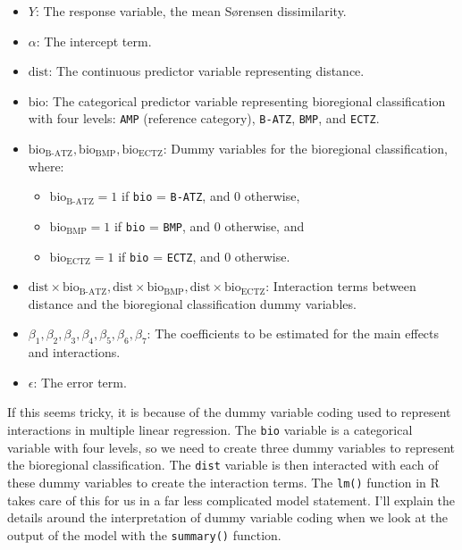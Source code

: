 \documentclass[
  letterpaper,
]{book}
\providecommand{\tightlist}{%
  \setlength{\itemsep}{0pt}\setlength{\parskip}{0pt}}\usepackage{longtable,booktabs,array}
\begin{document}
\begin{itemize}
\tightlist
\item
  \(Y\): The response variable, the mean Sørensen dissimilarity.
\item
  \(\alpha\): The intercept term.
\item
  \(\text{dist}\): The continuous predictor variable representing
  distance.
\item
  \(\text{bio}\): The categorical predictor variable representing
  bioregional classification with four levels: \texttt{AMP} (reference
  category), \texttt{B-ATZ}, \texttt{BMP}, and \texttt{ECTZ}.
\item
  \(\text{bio}_\text{B-ATZ}, \text{bio}_\text{BMP}, \text{bio}_\text{ECTZ}\):
  Dummy variables for the bioregional classification, where:

  \begin{itemize}
  \tightlist
  \item
    \(\text{bio}_\text{B-ATZ} = 1\) if \texttt{bio} = \texttt{B-ATZ},
    and 0 otherwise,
  \item
    \(\text{bio}_\text{BMP} = 1\) if \texttt{bio} = \texttt{BMP}, and 0
    otherwise, and
  \item
    \(\text{bio}_\text{ECTZ} = 1\) if \texttt{bio} = \texttt{ECTZ}, and
    0 otherwise.
  \end{itemize}
\item
  \(\text{dist} \times \text{bio}_\text{B-ATZ}, \text{dist} \times \text{bio}_\text{BMP}, \text{dist} \times \text{bio}_\text{ECTZ}\):
  Interaction terms between distance and the bioregional classification
  dummy variables.
\item
  \(\beta_1, \beta_2, \beta_3, \beta_4, \beta_5, \beta_6, \beta_7\): The
  coefficients to be estimated for the main effects and interactions.
\item
  \(\epsilon\): The error term.
\end{itemize}

If this seems tricky, it is because of the dummy variable coding used to
represent interactions in multiple linear regression. The \texttt{bio}
variable is a categorical variable with four levels, so we need to
create three dummy variables to represent the bioregional
classification. The \texttt{dist} variable is then interacted with each
of these dummy variables to create the interaction terms. The
\texttt{lm()} function in R takes care of this for us in a far less
complicated model statement. I'll explain the details around the
interpretation of dummy variable coding when we look at the output of
the model with the \texttt{summary()} function.
\end{document}
